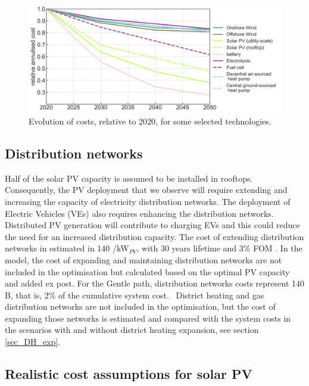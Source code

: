 \documentclass[3p]{elsarticle} %
\begin{document}
\begin{figure}[!h]
\centering
\includegraphics[width=12cm]{figures/cost_evolution.png}
\caption{Evolution of costs, relative to 2020, for some selected technologies. } \label{fig_cost_evolution} 
\end{figure}
 

\FloatBarrier
\subsection{Distribution networks} 

Half of the solar PV capacity is assumed to be installed in rooftops. Consequently, the PV deployment that we observe will require extending and increasing the capacity of electricity distribution networks. The deployment of Electric Vehicles (VEs) also requires enhancing the distribution networks. Distributed PV generation will contribute to charging EVs and this could reduce the need for an increased distribution capacity. The cost of extending distribution networks in estimated in 140 \EUR/kW$_{PV}$, with 30 years lifetime and 3\% FOM \cite{Sterchele_2020}. In the model, the cost of expanding and maintaining distribution networks are not included in the optimisation but calculated based on the optimal PV capacity and added ex post. For the Gentle path, distribution networks costs represent 140 B\EUR, that is, 2\% of the cumulative system cost.  \
District heating and gas distribution networks are not included in the optimisation, but the cost of expanding those networks is estimated and compared with the system costs in the scenarios with and without district heating expansion, see section \ref{sec_DH_exp}. 

\subsection{Realistic cost assumptions for solar PV} 
\end{document}
